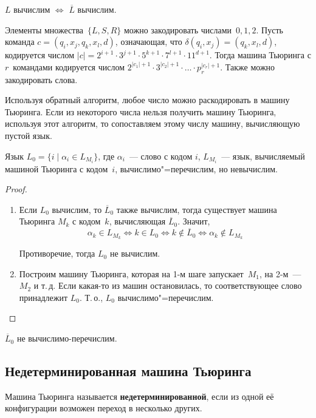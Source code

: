 \begin{statement}
$L$ вычислим $\Leftrightarrow$ $\overline L$ вычислим.
\end{statement}

Элементы множества~$\{ L, S, R \}$ можно закодировать числами~$0, 1, 2$.
Пусть команда $c = (q_i, x_j, q_k, x_l, d)$, означающая, что $\delta(q_i, x_j) = (q_k, x_l, d)$, кодируется числом $|c| = 2^{i+1} \cdot 3^{j+1} \cdot 5^{k+1} \cdot 7^{l+1} \cdot 11^{d+1}$.
Тогда машина Тьюринга с $r$~командами кодируется числом $2^{|c_1| + 1} \cdot 3^{|c_2| + 1} \cdot \ldots \cdot p_r^{|c_r| + 1}$.
Также можно закодировать слова.

Используя обратный алгоритм, любое число можно раскодировать в машину Тьюринга.
Если из некоторого числа нельзя получить машину Тьюринга, используя этот алгоритм, то сопоставляем этому числу машину, вычисляющую пустой язык.

\begin{theorem}
Язык $L_0 = \{ i \mid \alpha_i \in L_{M_i} \}$, где $\alpha_i$~--- слово с кодом $i$, $L_{M_i}$~--- язык, вычисляемый машиной Тьюринга с кодом~$i$, вычислимо"=перечислим, но невычислим.
\end{theorem}
\begin{proof}
\begin{enumerate}
	\item Если $L_0$ вычислим, то $\overline L_0$ также вычислим, тогда существует машина Тьюринга $M_k$ с кодом~$k$, вычисляющая $\overline L_0$.
	Значит,
	\begin{equation*}
	\alpha_k \in L_{M_k} \Leftrightarrow
	k \in L_0 \Leftrightarrow
	k \notin \overline L_0 \Leftrightarrow
	\alpha_k \notin L_{M_k}
	\end{equation*}
	
	Противоречие, тогда $L_0$ не вычислим.
	
	\item Построим машину Тьюринга, которая на 1-м шаге запускает~$M_1$, на 2-м~--- $M_2$ и т.\,д.
	Если какая-то из машин остановилась, то соответствующее слово принадлежит $L_0$.
	Т.\,о., $L_0$ вычислимо"=перечислим.
\end{enumerate}
\end{proof}

\begin{consequent}
$\overline L_0$ не вычислимо-перечислим.
\end{consequent}

\subsection{Недетерминированная машина Тьюринга}
 Машина Тьюринга называется \textbf{недетерминированной}, если из одной её конфигурации возможен переход в несколько других.

